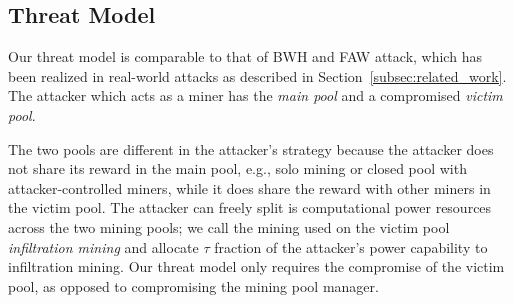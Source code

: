 \subsection{Threat Model}
\label{related:threat_model}
Our threat model is comparable to that of BWH and FAW attack, which has been realized in real-world attacks as described in Section~\ref{subsec:related_work}.
The attacker which acts as a miner has the \emph{main pool} and a compromised \emph{victim pool}.


The two pools are different in the attacker's strategy because the attacker does not share its reward in the main pool, e.g., solo mining or closed pool with attacker-controlled miners, while it does share the reward with other miners in the victim pool. %
The attacker can freely split is computational power resources across the two mining pools;
we call the mining used on the victim pool \emph{infiltration mining} and allocate $\tau$ fraction of the attacker's power capability to infiltration mining.
Our threat model only requires the compromise of the victim pool, as opposed to compromising the mining pool manager.

